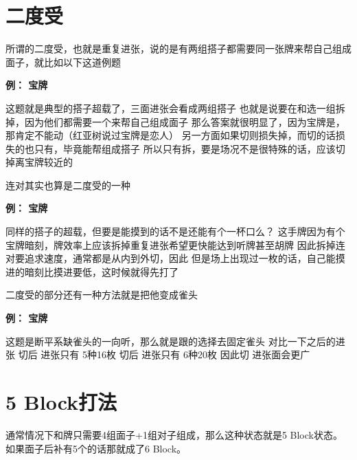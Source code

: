 \documentclass[小V的日麻笔记.tex]{subfiles}
\begin{document}
\section{二度受}
所谓的二度受，也就是重复进张，说的是有两组搭子都需要同一张牌来帮自己组成面子，就比如以下这道例题


\textbf{例： 宝牌 } 


\begin{itemize}
\arrowitem 这题就是典型的搭子超载了，三面进张会看成两组搭子
\arrowitem 也就是说要在和选一组拆掉，因为他们都需要一个来帮自己组成面子
\arrowitem 那么答案就很明显了，因为宝牌是，那肯定不能动（红亚树说过宝牌是恋人）
\arrowitem 另一方面如果切则损失掉，而切的话损失的也只有，毕竟能帮组成搭子
\arrowitem 所以只有拆，要是场况不是很特殊的话，应该切掉离宝牌较近的
\end{itemize}

连对其实也算是二度受的一种

\textbf{例： 宝牌 } 


\begin{itemize}
\arrowitem 同样的搭子的超载，但要是能摸到的话不是还能有个一杯口么？
\arrowitem 这手牌因为有个宝牌暗刻，牌效率上应该拆掉重复进张希望更快能达到听牌甚至胡牌
\arrowitem 因此拆掉连对要追求速度，通常都是从内到外切，因此
\arrowitem 但是场上出现过一枚的话，自己能摸进的暗刻比摸进要低，这时候就得先打了
\end{itemize}

二度受的部分还有一种方法就是把他变成雀头

\textbf{例： 宝牌 } 


\begin{itemize}
\arrowitem 这题是断平系缺雀头的一向听，那么就是跟的选择去固定雀头
\arrowitem 对比一下之后的进张 \newline
切后 进张只有  5种16枚 \newline
切后 进张只有  6种20枚
\arrowitem 因此切 进张面会更广
\end{itemize}

\section{5 Block打法}

通常情况下和牌只需要4组面子+1组对子组成，那么这种状态就是5 Block状态。如果面子后补有5个的话那就成了6 Block。
\end{document}
